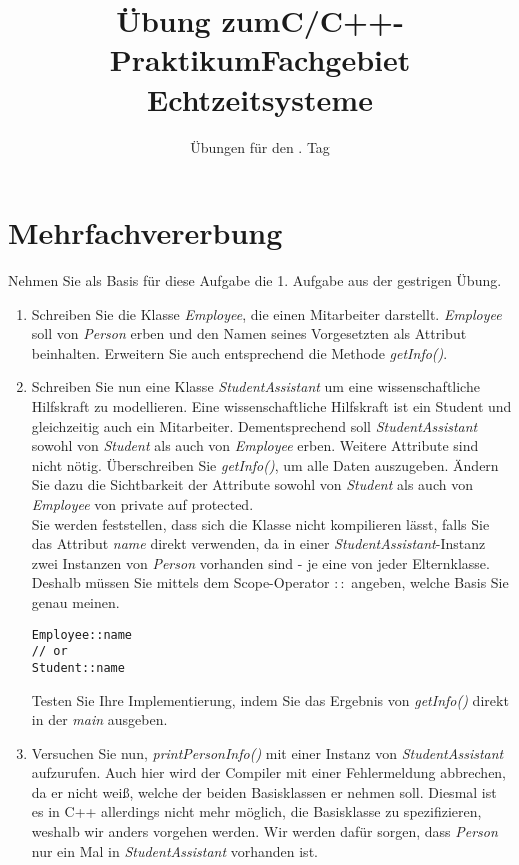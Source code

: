 \documentclass[
  accentcolor=tud1c,	%
  colorbacktitle,		%
  inverttitle,			%
  german,				%
  twoside
]{tudexercise}
\title{Übung zum\linebreak[1]C/C++-Praktikum\linebreak[1] Fachgebiet Echtzeitsysteme}
\subtitle{Übungen für den \tag{}. Tag}
\newcommand{\tag}{4}
\begin{document}
\begin{examheader}
	\textmb{Übung zum C/C++-Praktikum - Tag \tag{}}
\end{examheader}
\maketitle 

\vspace{5mm}

\section{Mehrfachvererbung}
Nehmen Sie als Basis für diese Aufgabe die 1. Aufgabe aus der gestrigen Übung.

\begin{enumerate}
\item
Schreiben Sie die Klasse \emph{Employee}, die einen Mitarbeiter darstellt. \emph{Employee} soll von \emph{Person} erben und den Namen seines Vorgesetzten als Attribut beinhalten. Erweitern Sie auch entsprechend die Methode \emph{getInfo()}.

\item
Schreiben Sie nun eine Klasse \emph{StudentAssistant} um eine wissenschaftliche Hilfskraft zu modellieren. Eine wissenschaftliche Hilfskraft ist ein Student und gleichzeitig auch ein Mitarbeiter. Dementsprechend soll \emph{StudentAssistant} sowohl von \emph{Student} als auch von \emph{Employee} erben. Weitere Attribute sind nicht nötig. Überschreiben Sie \emph{getInfo()}, um alle Daten auszugeben. Ändern Sie dazu die Sichtbarkeit der Attribute sowohl von \emph{Student} als auch von \emph{Employee} von private auf protected. \\

Sie werden feststellen, dass sich die Klasse nicht kompilieren lässt, falls Sie das Attribut \emph{name} direkt verwenden, da in einer \emph{StudentAssistant}-Instanz zwei Instanzen von \emph{Person} vorhanden sind - je eine von jeder Elternklasse. Deshalb müssen Sie mittels dem Scope-Operator $::$ angeben, welche Basis Sie genau meinen.
\begin{lstlisting}
Employee::name
// or
Student::name
\end{lstlisting}

Testen Sie Ihre Implementierung, indem Sie das Ergebnis von \emph{getInfo()} direkt in der \emph{main} ausgeben.

\item
Versuchen Sie nun, \emph{printPersonInfo()} mit einer Instanz von \emph{StudentAssistant} aufzurufen. Auch hier wird der Compiler mit einer Fehlermeldung abbrechen, da er nicht weiß, welche der beiden Basisklassen er nehmen soll. Diesmal ist es in C++ allerdings nicht mehr möglich, die Basisklasse zu spezifizieren, weshalb wir anders vorgehen werden. Wir werden dafür sorgen, dass \emph{Person} nur ein Mal in \emph{StudentAssistant} vorhanden ist. \\


\end{enumerate}
\end{document}
